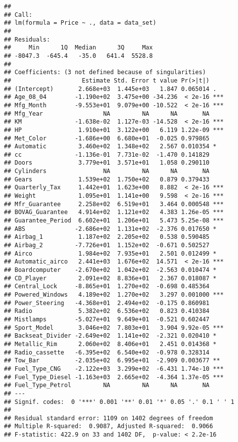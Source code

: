 \documentclass[]{article}
\begin{document}
\begin{verbatim}
## 
## Call:
## lm(formula = Price ~ ., data = data_set)
## 
## Residuals:
##     Min      1Q  Median      3Q     Max 
## -8047.3  -645.4   -35.0   641.4  5528.8 
## 
## Coefficients: (3 not defined because of singularities)
##                    Estimate Std. Error t value Pr(>|t|)    
## (Intercept)       2.668e+03  1.445e+03   1.847 0.065014 .  
## Age_08_04        -1.190e+02  3.475e+00 -34.236  < 2e-16 ***
## Mfg_Month        -9.553e+01  9.079e+00 -10.522  < 2e-16 ***
## Mfg_Year                 NA         NA      NA       NA    
## KM               -1.638e-02  1.127e-03 -14.528  < 2e-16 ***
## HP                1.910e+01  3.122e+00   6.119 1.22e-09 ***
## Met_Color        -1.686e+00  6.680e+01  -0.025 0.979865    
## Automatic         3.460e+02  1.348e+02   2.567 0.010354 *  
## cc               -1.136e-01  7.731e-02  -1.470 0.141829    
## Doors             3.779e+01  3.571e+01   1.058 0.290110    
## Cylinders                NA         NA      NA       NA    
## Gears             1.539e+02  1.750e+02   0.879 0.379433    
## Quarterly_Tax     1.442e+01  1.623e+00   8.882  < 2e-16 ***
## Weight            1.095e+01  1.141e+00   9.598  < 2e-16 ***
## Mfr_Guarantee     2.258e+02  6.519e+01   3.464 0.000548 ***
## BOVAG_Guarantee   4.914e+02  1.121e+02   4.383 1.26e-05 ***
## Guarantee_Period  6.602e+01  1.206e+01   5.473 5.25e-08 ***
## ABS              -2.686e+02  1.131e+02  -2.376 0.017650 *  
## Airbag_1          1.187e+02  2.205e+02   0.538 0.590485    
## Airbag_2         -7.726e+01  1.152e+02  -0.671 0.502527    
## Airco             1.984e+02  7.935e+01   2.501 0.012499 *  
## Automatic_airco   2.441e+03  1.676e+02  14.571  < 2e-16 ***
## Boardcomputer    -2.670e+02  1.042e+02  -2.563 0.010474 *  
## CD_Player         2.091e+02  8.836e+01   2.367 0.018087 *  
## Central_Lock     -8.865e+01  1.270e+02  -0.698 0.485364    
## Powered_Windows   4.189e+02  1.270e+02   3.297 0.001000 ***
## Power_Steering   -4.368e+01  2.494e+02  -0.175 0.860981    
## Radio             5.382e+02  6.536e+02   0.823 0.410384    
## Mistlamps        -5.027e+01  9.649e+01  -0.521 0.602447    
## Sport_Model       3.046e+02  7.803e+01   3.904 9.92e-05 ***
## Backseat_Divider -2.649e+02  1.141e+02  -2.321 0.020410 *  
## Metallic_Rim      2.060e+02  8.406e+01   2.451 0.014368 *  
## Radio_cassette   -6.395e+02  6.540e+02  -0.978 0.328314    
## Tow_Bar          -2.035e+02  6.995e+01  -2.909 0.003677 ** 
## Fuel_Type_CNG    -2.122e+03  3.299e+02  -6.431 1.74e-10 ***
## Fuel_Type_Diesel -1.163e+03  2.665e+02  -4.364 1.37e-05 ***
## Fuel_Type_Petrol         NA         NA      NA       NA    
## ---
## Signif. codes:  0 '***' 0.001 '**' 0.01 '*' 0.05 '.' 0.1 ' ' 1
## 
## Residual standard error: 1109 on 1402 degrees of freedom
## Multiple R-squared:  0.9087, Adjusted R-squared:  0.9066 
## F-statistic: 422.9 on 33 and 1402 DF,  p-value: < 2.2e-16
\end{verbatim}
\end{document}
